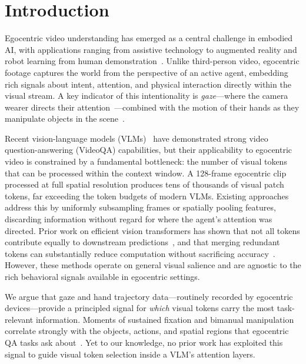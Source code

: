 \section{Introduction}

Egocentric video understanding has emerged as a central challenge in embodied AI, with applications
ranging from assistive technology to augmented reality and robot learning from human
demonstration~\cite{grauman2022ego4d,grauman2024egoexo4d,wang2023holoassist}.
Unlike third-person video, egocentric footage captures the world from the perspective of an active
agent, embedding rich signals about intent, attention, and physical interaction directly within the
visual stream.
A key indicator of this intentionality is \emph{gaze}—where the camera wearer directs their
attention~\cite{li2018egtea,huang2018predicting}—combined with the motion of their hands as they
manipulate objects in the scene~\cite{nagarajan2020ego}.

Recent vision-language models (VLMs)~\cite{wang2024qwen2vl,lin2023videollava} have demonstrated
strong video question-answering (VideoQA) capabilities, but their applicability to egocentric video
is constrained by a fundamental bottleneck: the number of visual tokens that can be processed
within the context window.
A 128-frame egocentric clip processed at full spatial resolution produces tens of thousands of
visual patch tokens, far exceeding the token budgets of modern VLMs.
Existing approaches address this by uniformly subsampling frames or spatially pooling features,
discarding information without regard for where the agent's attention was directed.
Prior work on efficient vision transformers has shown that not all tokens contribute equally to
downstream predictions~\cite{rao2021dynamicvit,liang2022evit}, and that merging redundant tokens
can substantially reduce computation without sacrificing
accuracy~\cite{bolya2023tome}.
However, these methods operate on general visual salience and are agnostic to the rich behavioral
signals available in egocentric settings.

We argue that gaze and hand trajectory data—routinely recorded by egocentric devices—provide a
principled signal for \emph{which} visual tokens carry the most task-relevant information.
Moments of sustained fixation and bimanual manipulation correlate strongly with the objects,
actions, and spatial regions that egocentric QA tasks ask about~\cite{li2018egtea,mangalam2024egoschema}.
Yet to our knowledge, no prior work has exploited this signal to guide visual token selection
inside a VLM's attention layers.

